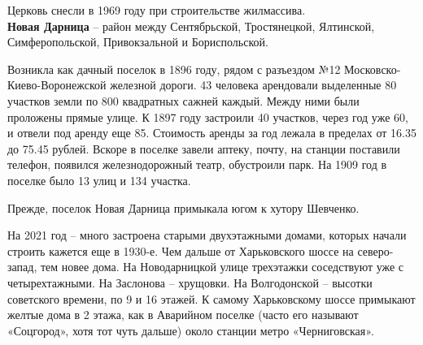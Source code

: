 Церковь снесли в 1969 году при строительстве жилмассива.\\ 

\textbf{Новая Дарница} – район между Сентябрьской, Тростянецкой, Ялтинской, Симферопольской, Привокзальной и Бориспольской. 

Возникла как дачный поселок в 1896 году, рядом с разъездом №12 Московско-Киево-Воронежской железной дороги. 43 человека арендовали выделенные 80 участков земли по 800 квадратных сажней каждый. Между ними были проложены прямые улице. К 1897 году застроили 40 участков, через год уже 60, и отвели под аренду еще 85. Стоимость аренды за год лежала в пределах от 16.35 до 75.45 рублей. Вскоре в поселке завели аптеку, почту, на станции поставили телефон, появился железнодорожный театр, обустроили парк. На 1909 год в поселке было 13 улиц и 134 участка.

Прежде, поселок Новая Дарница примыкала югом к хутору Шевченко. 

На 2021 год – много застроена старыми двухэтажными домами, которых начали строить кажется еще в 1930-е. Чем дальше от Харьковского шоссе на северо-запад, тем новее дома. На Новодарницкой улице трехэтажки соседствуют уже с четырехтажными. На Заслонова – хрущовки. На Волгодонской – высотки советского времени, по 9 и 16 этажей. К самому Харьковскому шоссе примыкают желтые дома в 2 этажа, как в Аварийном поселке (часто его называют «Соцгород», хотя тот чуть дальше) около станции метро «Черниговская».
